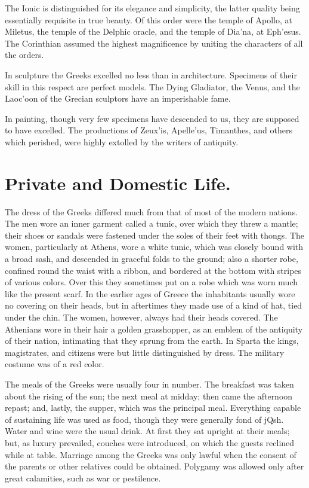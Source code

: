 \documentclass[openany,a4paper]{memoir}
\begin{document}
The Ionic is distinguished for its elegance and simplicity, 
the latter quality being essentially requisite in true beauty. 
Of this order were the temple of Apollo, at Miletus, the 
temple of the Delphic oracle, and the temple of Dia'na, at 
Eph'esus. The Corinthian assumed the highest magnificence by uniting the characters of all the orders. 

In sculpture the Greeks excelled no less than in architecture. Specimens of their skill in this respect are perfect models. The Dying Gladiator, the Venus, and the 
Laoc'oon of the Grecian sculptors have an imperishable 
fame. 

In painting, though very few specimens have descended 
to us, they are supposed to have excelled. The productions 
of Zeux'is, Apelle'us, Timanthes, and others which perished, were highly extolled by the writers of antiquity. 

\section{Private and Domestic Life.}

The dress of the Greeks differed much from that of most of the modern nations. The 
men wore an inner garment called a tunic, over which they 
threw a mantle; their shoes or sandals were fastened under 
the soles of their feet with thongs. The women, particularly at Athens, wore a white tunic, which was closely bound 
with a broad sash, and descended in graceful folds to the 
ground; also a shorter robe, confined round the waist with 
a ribbon, and bordered at the bottom with stripes of various 
colors. Over this they sometimes put on a robe which was 
worn much like the present scarf. In the earlier ages of 
Greece the inhabitants usually wore no covering on their 
heads, but in aftertimes they made use of a kind of hat, 
tied under the chin. The women, however, always had 
their heads covered. The Athenians wore in their hair a 
golden grasshopper, as an emblem of the antiquity of their 
nation, intimating that they sprung from the earth. In 
Sparta the kings, magistrates, and citizens were but little 
distinguished by dress. The military costume was of a red 
color. 

The meals of the Greeks were usually four in number. 
The breakfast was taken about the rising of the sun; the 
next meal at midday; then came the afternoon repast; and, 
lastly, the supper, which was the principal meal. Everything capable of sustaining life was used as food, though 
they were generally fond of jQsh. Water and wine were the 
usual drink. At first they sat upright at their meals; but, 
as luxury prevailed, couches were introduced, on which the 
guests reclined while at table. Marriage among the Greeks 
was only lawful when the consent of the parents or other 
relatives could be obtained. Polygamy was allowed only 
after great calamities, such as war or pestilence. 
\end{document}
